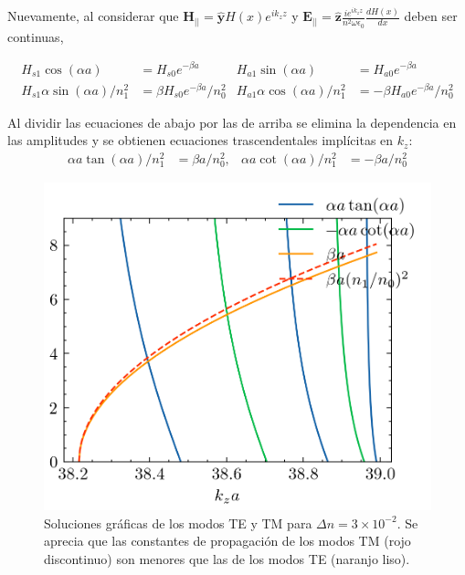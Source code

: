 Nuevamente, al considerar que $\textbf{H}_{||}= \mathbf{\hat{y}} H(x)e^{i k_z z }$ y $\textbf{E}_{||} = \mathbf{\hat{z}} \frac{ie^{i k_z z }}{n^2 \omega \epsilon_0} \frac{d H(x)}{dx}$ deben ser continuas, 

\begin{align*}
H_{s1}\cos(\alpha a) &= H_{s0} e^{-\beta a} & H_{a1}\sin(\alpha a) &= H_{a0} e^{-\beta a}
\\
H_{s1}\alpha\sin(\alpha a)/n_1^2 &= \beta H_{s0} e^{-\beta a}/n_0^2 & H_{a1}\alpha\cos(\alpha a)/n_1^2 &= -\beta H_{a0} e^{-\beta a}/n_0^2
\end{align*}

Al dividir las ecuaciones de abajo por las de arriba se elimina la dependencia en las amplitudes y se obtienen ecuaciones trascendentales implícitas en $k_z$:
\begin{align}
	\alpha a \tan(\alpha a)/n_1^2 &= \beta a/n_0^2, & \alpha a \cot(\alpha a)/n_1^2 &= -\beta a/n_0^2 \label{eqn:trascendentalTM}
\end{align}


\begin{figure}[H]
	\centering
	\includegraphics[width=0.7\linewidth]{media/slabgraphicalTETM1}
	\caption[Soluciones gráficas de los modos TE y TM]{Soluciones gráficas de los modos TE y TM para $\Delta n = 3\times 10^{-2}$. Se aprecia que las constantes de propagación de los modos TM (rojo discontinuo) son menores que las de los modos TE (naranjo liso).}
\end{figure}
